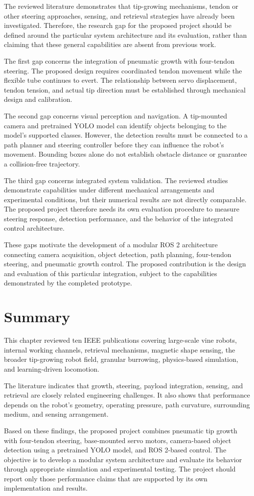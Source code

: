 The reviewed literature demonstrates that tip-growing mechanisms, tendon or other steering approaches, sensing, and retrieval strategies have already been investigated. Therefore, the research gap for the proposed project should be defined around the particular system architecture and its evaluation, rather than claiming that these general capabilities are absent from previous work.

The first gap concerns the integration of pneumatic growth with four-tendon steering. The proposed design requires coordinated tendon movement while the flexible tube continues to evert. The relationship between servo displacement, tendon tension, and actual tip direction must be established through mechanical design and calibration.

The second gap concerns visual perception and navigation. A tip-mounted camera and pretrained YOLO model can identify objects belonging to the model's supported classes. However, the detection results must be connected to a path planner and steering controller before they can influence the robot's movement. Bounding boxes alone do not establish obstacle distance or guarantee a collision-free trajectory.

The third gap concerns integrated system validation. The reviewed studies demonstrate capabilities under different mechanical arrangements and experimental conditions, but their numerical results are not directly comparable. The proposed project therefore needs its own evaluation procedure to measure steering response, detection performance, and the behavior of the integrated control architecture.

These gaps motivate the development of a modular ROS 2 architecture connecting camera acquisition, object detection, path planning, four-tendon steering, and pneumatic growth control. The proposed contribution is the design and evaluation of this particular integration, subject to the capabilities demonstrated by the completed prototype.

\section{Summary}

This chapter reviewed ten IEEE publications covering large-scale vine robots, internal working channels, retrieval mechanisms, magnetic shape sensing, the broader tip-growing robot field, granular burrowing, physics-based simulation, and learning-driven locomotion.

The literature indicates that growth, steering, payload integration, sensing, and retrieval are closely related engineering challenges. It also shows that performance depends on the robot's geometry, operating pressure, path curvature, surrounding medium, and sensing arrangement.

Based on these findings, the proposed project combines pneumatic tip growth with four-tendon steering, base-mounted servo motors, camera-based object detection using a pretrained YOLO model, and ROS 2-based control. The objective is to develop a modular system architecture and evaluate its behavior through appropriate simulation and experimental testing. The project should report only those performance claims that are supported by its own implementation and results.
